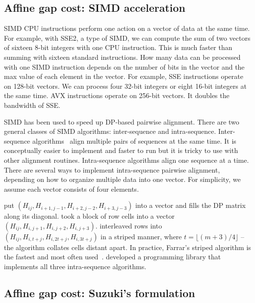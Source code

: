 \documentclass{bioinfo}
\begin{document}
\subsection{Affine gap cost: SIMD acceleration}

SIMD CPU instructions perform one action on a vector of data at the same time.
For example, with SSE2, a type of SIMD, we can compute the sum of two vectors
of sixteen 8-bit integers with one CPU instruction. This is much faster than
summing with sixteen standard instructions. How many data can be processed with
one SIMD instruction depends on the number of bits in the vector and the max
value of each element in the vector. For example, SSE instructions operate on
128-bit vectors. We can process four 32-bit integers or eight 16-bit integers
at the same time. AVX instructions operate on 256-bit vectors. It doubles the
bandwidth of SSE.

SIMD has been used to speed up DP-based pairwise alignment. There are two
general classes of SIMD algorithms: inter-sequence and intra-sequence.
Inter-sequence algorithms~\citep{Rognes:2011aa} align multiple pairs of
sequences at the same time. It is conceptually easier to implement and faster
to run but it is tricky to use with other alignment routines. Intra-sequence
algorithms align one sequence at a time. There are several ways to implement
intra-sequence pairwise alignment, depending on how to organize multiple data
into one vector.  For simplicity, we assume each vector consists of four
elements.

\citet{Wozniak:1997aa} put $(H_{ij},H_{i+1,j-1},H_{i+2,j-2},H_{i+3,j-3})$
into a vector and fills the DP matrix along its diagonal.
\citet{Rognes:2000aa} took a block of row cells into a vector
$(H_{ij},H_{i,j+1},H_{i,j+2},H_{i,j+3})$. \citet{Farrar:2007hs} interleaved rows
into $(H_{ij},H_{i,t+j},H_{i,2t+j},H_{i,3t+j})$ in a striped manner, where
$t=\lfloor(m+3)/4\rfloor$ -- the algorithm collates cells distant apart. In
practice, Farrar's striped algorithm is the fastest and most often
used~\citep{Szalkowski:2008aa,Zhao:2013aa}. \citet{Daily:2016aa} developed a
programming library that implements all three intra-sequence algorithms.

\subsection{Affine gap cost: Suzuki's formulation}
\end{document}
